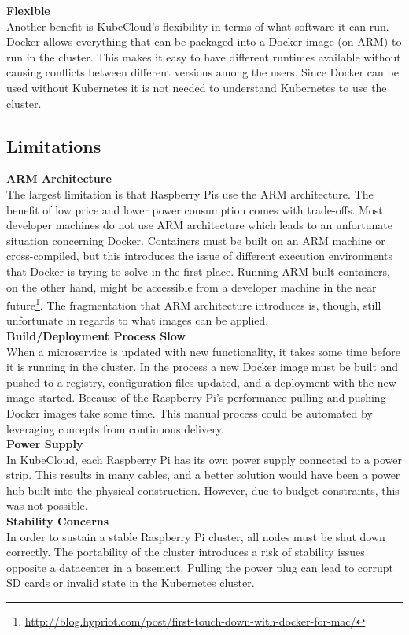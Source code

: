 \noindent \textbf{Flexible} \\
Another benefit is KubeCloud's flexibility in terms of what software it can run. Docker allows everything that can be packaged into a Docker image (on ARM) to run in the cluster. This makes it easy to have different runtimes available without causing conflicts between different versions among the users. Since Docker can be used without Kubernetes it is not needed to understand Kubernetes to use the cluster. 

\subsection*{Limitations}
\textbf{ARM Architecture} \\
The largest limitation is that Raspberry Pis use the ARM architecture. The benefit of low price and lower power consumption comes with trade-offs. Most developer machines do not use ARM architecture which leads to an unfortunate situation concerning Docker. Containers must be built on an ARM machine or cross-compiled, but this introduces the issue of different execution environments that Docker is trying to solve in the first place. Running ARM-built containers, on the other hand, might be accessible from a developer machine in the near future\footnote{\url{http://blog.hypriot.com/post/first-touch-down-with-docker-for-mac/}}. The fragmentation that ARM architecture introduces is, though, still unfortunate in regards to what images can be applied. \\

\noindent \textbf{Build/Deployment Process Slow} \\
When a microservice is updated with new functionality, it takes some time before it is running in the cluster. In the process a new Docker image must be built and pushed to a registry, configuration files updated, and a deployment with the new image started. Because of the Raspberry Pi's performance pulling and pushing Docker images take some time. This manual process could be automated by leveraging concepts from continuous delivery. \\

\noindent \textbf{Power Supply} \\
In KubeCloud, each Raspberry Pi has its own power supply connected to a power strip. This results in many cables, and a better solution would have been a power hub built into the physical construction. However, due to budget constraints, this was not possible. \\

\noindent \textbf{Stability Concerns} \\
In order to sustain a stable Raspberry Pi cluster, all nodes must be shut down correctly. The portability of the cluster introduces a risk of stability issues opposite a datacenter in a basement. Pulling the power plug can lead to corrupt SD cards or invalid state in the Kubernetes cluster. 